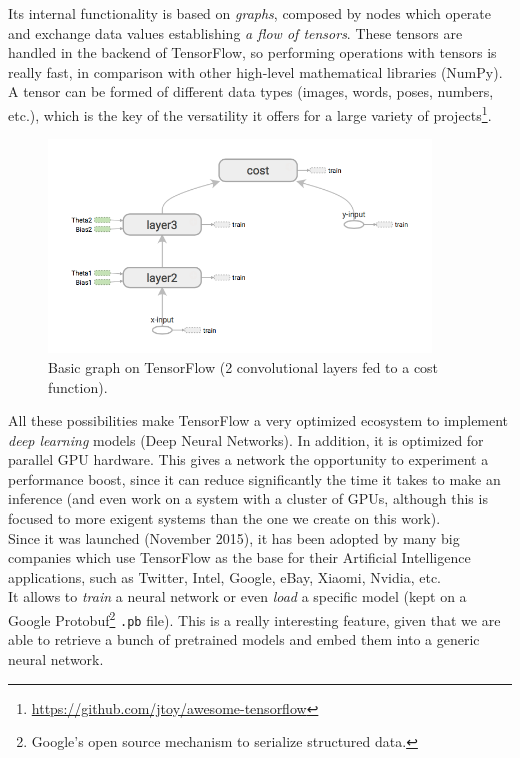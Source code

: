 	Its internal functionality is based on \emph{graphs}, composed by nodes which operate and exchange data values establishing \emph{a flow of tensors}. These tensors are handled in the backend of TensorFlow, so performing operations with tensors is really fast, in comparison with other high-level mathematical libraries (NumPy). A tensor can be formed of different data types (images, words, poses, numbers, etc.), which is the key of the versatility it offers for a large variety of projects\footnote{\url{https://github.com/jtoy/awesome-tensorflow}}.\\
	
	\begin{figure}[h]
		\centering
		\includegraphics[width=4in]{images/tf_graph}
		\caption{Basic graph on TensorFlow (2 convolutional layers fed to a cost function).}
		\label{fig:3_tf_graph}
	\end{figure}
	
	All these possibilities make TensorFlow a very optimized ecosystem to implement \emph{deep learning} models (Deep Neural Networks). In addition, it is optimized for parallel GPU hardware. This gives a network the opportunity to experiment a performance boost, since it can reduce significantly the time it takes to make an inference (and even work on a system with a cluster of GPUs, although this is focused to more exigent systems than the one we create on this work).\\
	
	Since it was launched (November 2015), it has been adopted by many big companies which use TensorFlow as the base for their Artificial Intelligence applications, such as Twitter, Intel, Google, eBay, Xiaomi, Nvidia, etc.\\
	
	It allows to \emph{train} a neural network or even \emph{load} a specific model (kept on a Google Protobuf\footnote{Google's open source mechanism to serialize structured data.} \texttt{.pb} file). This is a really interesting feature, given that we are able to retrieve a bunch of pretrained models and embed them into a generic neural network.\\
	
